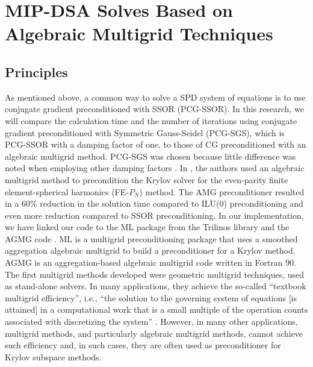 \section{MIP-DSA Solves Based on Algebraic Multigrid Techniques} \label{sec_amg}

\subsection{Principles}

As mentioned above, a common way to solve a SPD system of equations is to use
conjugate gradient preconditioned with SSOR (PCG-SSOR). In this research, we
will compare the calculation time and the number of iterations using conjugate 
gradient preconditioned with Symmetric Gauss-Seidel (PCG-SGS), which is PCG-SSOR with a
damping factor of one, to those of CG preconditioned with an
algebraic multigrid method. PCG-SGS was chosen because little difference was noted 
when employing other damping factors \cite{wang_personal_comm}. In \cite{amg_pn}, the authors 
used an algebraic multigrid method to precondition the Krylov solver for the 
even-parity finite element-spherical harmonics (FE-$P_N$) method. The AMG 
preconditioner resulted in a 60\% reduction in the solution time compared to 
ILU(0) preconditioning and even more reduction compared to SSOR preconditioning. 
In our implementation, we have linked our code to the ML package 
\cite{ml_guide} from the Trilinos library and the AGMG code \cite{agmg_guide}. 
ML is a multigrid preconditioning package that uses a smoothed aggregation 
algebraic multigrid to build a preconditioner for a Krylov method. AGMG is an 
aggregation-based algebraic multigrid code written in Fortran 90.
%
The first multigrid methods developed were geometric multigrid techniques, used as 
stand-alone solvers. In many applications, they achieve the so-called 
``textbook multigrid efficiency'', i.e., ``the solution to the governing 
system of equations [is attained] in a computational work that is a small 
multiple of the operation counts associated with discretizing the system'' 
\cite{textbook_eff}. However, in many other applications, multigrid methods, 
and particularly algebraic multigrid methods, cannot achieve such efficiency 
\cite{k_cycle} and, in such cases, they are often used as preconditioner for 
Krylov subspace methods. 

